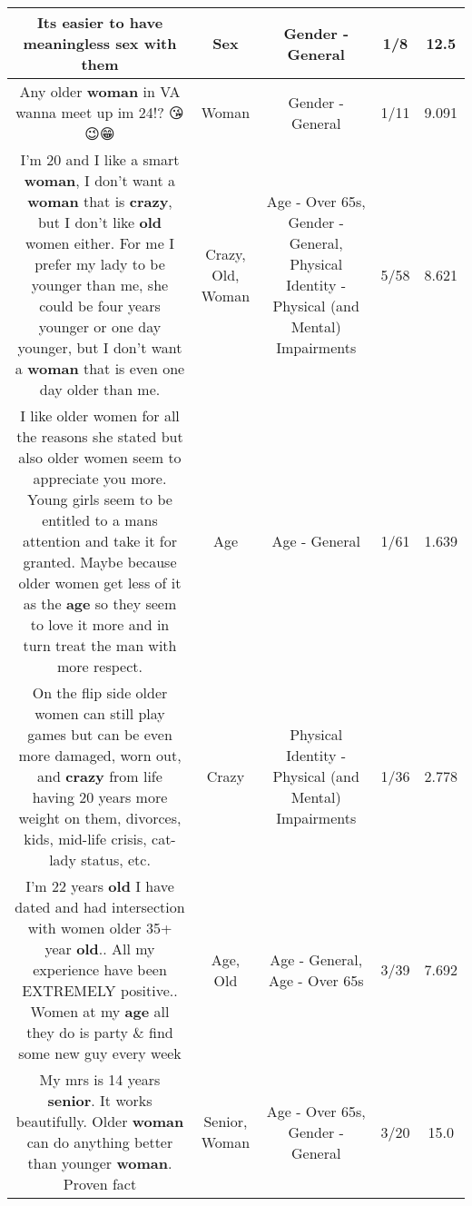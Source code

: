 \documentclass[11pt]{article}
\newlength\mylength
\begin{document}
\begin{center}
\begin{longtable}{|C{.65\mylength}|C{.30\mylength}|C{.12\mylength}|C{.12\mylength}|C{.12\mylength}|}
  \small Its easier to have meaningless \textbf{sex} with them\normalsize   & Sex & Gender - General & 1/8 & 12.5 \\  \hline
  \small Any older \textbf{woman} in VA wanna meet up im 24!? 😘😉😁\normalsize   & Woman & Gender - General & 1/11 & 9.091 \\  \hline
  \small I'm 20 and I like a smart \textbf{woman}, I don't want a \textbf{woman} that is \textbf{crazy}, but I don't like \textbf{old} women either. For me I prefer my lady to be younger than me, she could be four years younger or one day younger, but I don't want a \textbf{woman} that is even one day older than me.\normalsize   & Crazy, Old, Woman & Age - Over 65s, Gender - General, Physical Identity - Physical (and Mental) Impairments & 5/58 & 8.621 \\  \hline
  \small I like older women for all the reasons she stated but also older women seem to appreciate you more. Young girls seem to be entitled to a mans attention and take it for granted. Maybe because older women get less of it as the \textbf{age} so they seem to love it more and in turn treat the man with more respect.\normalsize   & Age & Age - General & 1/61 & 1.639 \\  \hline
  \small On the flip side older women can still play games but can be even more damaged, worn out, and \textbf{crazy} from life having 20 years more weight on them, divorces, kids, mid-life crisis, cat-lady status, etc.\normalsize   & Crazy & Physical Identity - Physical (and Mental) Impairments & 1/36 & 2.778 \\  \hline
  \small I'm 22 years \textbf{old} I have dated and had intersection with women older 35+ year \textbf{old}.. All my experience have been EXTREMELY positive.. Women at my \textbf{age} all they do is party \& find some new guy every week\normalsize   & Age, Old & Age - General, Age - Over 65s & 3/39 & 7.692 \\  \hline
  \small My mrs is 14 years \textbf{senior}. It works beautifully. Older \textbf{woman} can do anything better than younger \textbf{woman}. Proven fact\normalsize   & Senior, Woman & Age - Over 65s, Gender - General & 3/20 & 15.0 \\  \hline

\end{longtable}
\end{center}
\end{document}
